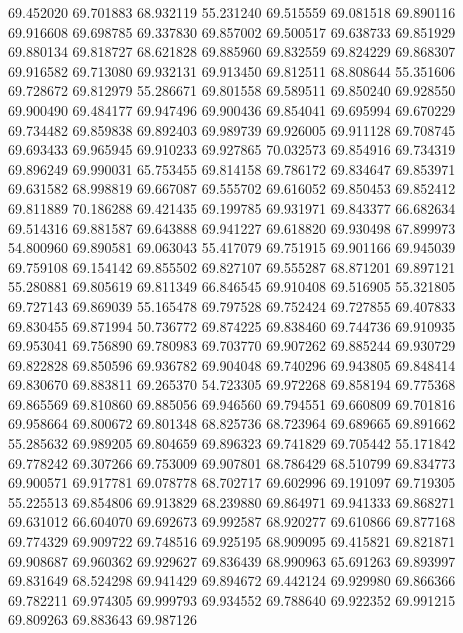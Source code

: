69.452020
69.701883
68.932119
55.231240
69.515559
69.081518
69.890116
69.916608
69.698785
69.337830
69.857002
69.500517
69.638733
69.851929
69.880134
69.818727
68.621828
69.885960
69.832559
69.824229
69.868307
69.916582
69.713080
69.932131
69.913450
69.812511
68.808644
55.351606
69.728672
69.812979
55.286671
69.801558
69.589511
69.850240
69.928550
69.900490
69.484177
69.947496
69.900436
69.854041
69.695994
69.670229
69.734482
69.859838
69.892403
69.989739
69.926005
69.911128
69.708745
69.693433
69.965945
69.910233
69.927865
70.032573
69.854916
69.734319
69.896249
69.990031
65.753455
69.814158
69.786172
69.834647
69.853971
69.631582
68.998819
69.667087
69.555702
69.616052
69.850453
69.852412
69.811889
70.186288
69.421435
69.199785
69.931971
69.843377
66.682634
69.514316
69.881587
69.643888
69.941227
69.618820
69.930498
67.899973
54.800960
69.890581
69.063043
55.417079
69.751915
69.901166
69.945039
69.759108
69.154142
69.855502
69.827107
69.555287
68.871201
69.897121
55.280881
69.805619
69.811349
66.846545
69.910408
69.516905
55.321805
69.727143
69.869039
55.165478
69.797528
69.752424
69.727855
69.407833
69.830455
69.871994
50.736772
69.874225
69.838460
69.744736
69.910935
69.953041
69.756890
69.780983
69.703770
69.907262
69.885244
69.930729
69.822828
69.850596
69.936782
69.904048
69.740296
69.943805
69.848414
69.830670
69.883811
69.265370
54.723305
69.972268
69.858194
69.775368
69.865569
69.810860
69.885056
69.946560
69.794551
69.660809
69.701816
69.958664
69.800672
69.801348
68.825736
68.723964
69.689665
69.891662
55.285632
69.989205
69.804659
69.896323
69.741829
69.705442
55.171842
69.778242
69.307266
69.753009
69.907801
68.786429
68.510799
69.834773
69.900571
69.917781
69.078778
68.702717
69.602996
69.191097
69.719305
55.225513
69.854806
69.913829
68.239880
69.864971
69.941333
69.868271
69.631012
66.604070
69.692673
69.992587
68.920277
69.610866
69.877168
69.774329
69.909722
69.748516
69.925195
68.909095
69.415821
69.821871
69.908687
69.960362
69.929627
69.836439
68.990963
65.691263
69.893997
69.831649
68.524298
69.941429
69.894672
69.442124
69.929980
69.866366
69.782211
69.974305
69.999793
69.934552
69.788640
69.922352
69.991215
69.809263
69.883643
69.987126
